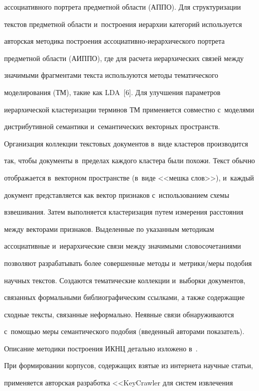 ассоциативного портрета предметной области (АППО). Для структуризации 


текстов предметной области и~построения иерархии категорий используется 


авторская методика построения ас\-со\-ци\-а\-тив\-но-ие\-рар\-хи\-че\-ско\-го портрета 


предметной области (АИППО), где для расчета иерархических связей между 


значимыми фрагментами текста используются методы тематического 


моделирования (ТМ), такие как LDA~[6]. Для улучшения параметров 


иерархической кластеризации терминов ТМ применяется совместно с~моделями 


дистрибутивной семантики и~семантических векторных пространств. 


Организация коллекции текстовых документов в~виде кластеров производится 


так, чтобы документы в~пределах каждого кластера были похожи. Текст обычно 


отображается в~векторном пространстве (в~виде <<мешка слов>>), и~каждый 


документ представляется как вектор признаков с~использованием схемы 


взвешивания. Затем выполняется кластеризация путем измерения расстояния 


между векторами признаков. Выделенные по указанным методикам 


ассоциативные и~иерархические связи между значимыми словосочетаниями 


позволяют разрабатывать более совершенные методы и~мет\-ри\-ки\!/\!ме\-ры подобия 


научных текстов. Создаются тематические коллекции и~выборки документов, 


связанных формальными библиографическим ссылками, а также содержащие 


сходные тексты, связанные неформально. Неявные связи обнаруживаются 


с~по\-мощью меры семантического подобия (введенный авторами показатель).


  


  Описание методики построения ИКНЦ детально изложено в~\cite{1-gal}. 


При формировании корпусов, содержащих взятые из интернета научные статьи, 


применяется авторская разработка <<KeyCrawler для систем извлечения 


